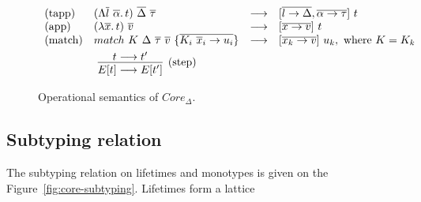 \documentclass[11pt]{article}
\newcommand{\ap}{~}
\begin{document}
    \begin{figure}
        \begin{gather*}
            \begin{array}{llll}
                \text{(tapp)} &(\Lambda \overline{l}~\overline{\alpha}\ldotp t)\ap \overline{\Delta} \ap \overline{\tau} &\longrightarrow &[\overline{l \to \Delta}, \overline{\alpha\to\tau}]\ap t
                \\
                \text{(app)} &(\lambda \overline{x}\ldotp t) \ap \overline{v} &\longrightarrow &[\overline{x\to v}]\ap t
                \\
                \text{(match)} &match ~K \ap\Delta\ap\overline{\tau}\ap \overline{v} ~ \{ \overline{K_i \ap \overline{x}_i \to u_i}\} &\longrightarrow &[\overline{x_k\to v}]\ap u_k, \text{ where } K = K_k
            \end{array}\\
            \hspace{-15em}\infer[\text{(step)}]{E[t]\longrightarrow E[t']}{t\longrightarrow t'}
        \end{gather*}
        \caption{Operational semantics of $Core_\Delta$.}
        \label{fig:core-operational}
    \end{figure}

    \subsection{Subtyping relation}

    The subtyping relation on lifetimes and monotypes is given on the Figure\ \ref{fig:core-subtyping}.
    Lifetimes form a lattice
\end{document}
